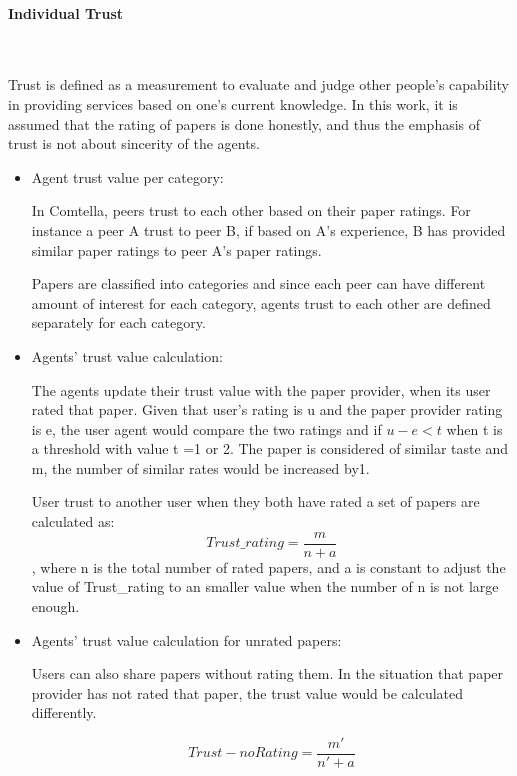 \documentclass [12pt]{article} \usepackage{multicol}
\begin{document}
\paragraph{Individual Trust}\mbox{}\\ \newline 

Trust is defined as a measurement to evaluate and judge other
people’s capability in providing services based on one's current knowledge. In this work,
 it is assumed that the rating of papers is done honestly, and thus the emphasis of trust is not about sincerity of
the agents.

\begin{itemize}

\item Agent trust value per category:

	In Comtella, peers trust to each other based on their paper
ratings. For instance a peer A trust to peer B, if based on A’s
experience, B has provided similar paper ratings to peer A’s paper
ratings.

	Papers are classified into categories and since each peer can
have different amount of interest for each category, agents trust to
each other are defined separately for each category.

\item Agents' trust value calculation:

	The agents update their trust value with the paper provider, when
its user rated that paper. Given that user’s rating is u and the
paper provider rating is e, the user agent would compare the two
ratings and if $ u - e < t $ when t is a threshold with value t =1 or 2. 
The paper is considered of similar taste and m, the number of similar
rates would be increased by1.

	User trust to another user when they both have rated a set of
papers are calculated as: $${Trust\_rating} =  \frac{ m }{ n + a} $$ , where n is the
total number of rated papers, and a is constant to adjust the value
of Trust\_rating to an smaller value when the number of n is not large
enough.

\item Agents' trust value calculation for unrated papers:

	Users can also share papers without rating them. In the situation
that paper provider has not rated that paper, the trust value would
be calculated differently.

	$$Trust-noRating = \frac{ m'}{ n' + a } $$


\end{itemize}
\end{document}
